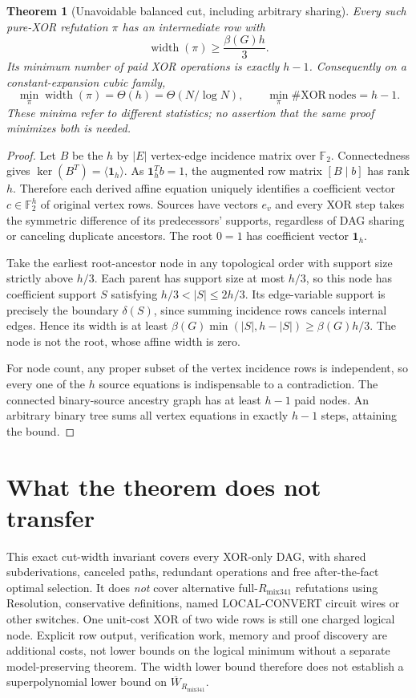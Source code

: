 \documentclass[11pt]{article}
\newtheorem{theorem}{Theorem}
\begin{document}
\begin{theorem}[Unavoidable balanced cut, including arbitrary sharing]
Every such pure-XOR refutation $\pi$ has an intermediate row with
\[
\operatorname{width}(\pi)\ge \frac{\beta(G)h}{3}.
\]
Its minimum number of paid XOR operations is exactly $h-1$. Consequently on a constant-expansion cubic family,
\[
\min_{\pi}\operatorname{width}(\pi)=\Theta(h)=\Theta(N/\log N),
\qquad
\min_{\pi}\#\mathrm{XOR\ nodes}=h-1.
\]
These minima refer to different statistics; no assertion that the same proof minimizes both is needed.
\end{theorem}
\begin{proof}
Let $B$ be the $h$ by $|E|$ vertex-edge incidence matrix over $\mathbb F_2$. Connectedness gives $\ker(B^T)=\langle\mathbf1_h\rangle$. As $\mathbf1_h^Tb=1$, the augmented row matrix $[B\mid b]$ has rank $h$. Therefore each derived affine equation uniquely identifies a coefficient vector $c\in\mathbb F_2^h$ of original vertex rows. Sources have vectors $e_v$ and every XOR step takes the symmetric difference of its predecessors' supports, regardless of DAG sharing or canceling duplicate ancestors. The root $0=1$ has coefficient vector $\mathbf1_h$.

Take the earliest root-ancestor node in any topological order with support size strictly above $h/3$. Each parent has support size at most $h/3$, so this node has coefficient support $S$ satisfying $h/3<|S|\le2h/3$. Its edge-variable support is precisely the boundary $\delta(S)$, since summing incidence rows cancels internal edges. Hence its width is at least $\beta(G)\min(|S|,h-|S|)\ge\beta(G)h/3$. The node is not the root, whose affine width is zero.

For node count, any proper subset of the vertex incidence rows is independent, so every one of the $h$ source equations is indispensable to a contradiction. The connected binary-source ancestry graph has at least $h-1$ paid nodes. An arbitrary binary tree sums all vertex equations in exactly $h-1$ steps, attaining the bound.
\end{proof}

\section*{What the theorem does not transfer}
This exact cut-width invariant covers every XOR-only DAG, with shared subderivations, canceled paths, redundant operations and free after-the-fact optimal selection. It does \emph{not} cover alternative full-$R_{\mathrm{mix341}}$ refutations using Resolution, conservative definitions, named LOCAL-CONVERT circuit wires or other switches. One unit-cost XOR of two wide rows is still one charged logical node. Explicit row output, verification work, memory and proof discovery are additional costs, not lower bounds on the logical minimum without a separate model-preserving theorem. The width lower bound therefore does not establish a superpolynomial lower bound on $\overline W_{R_{\mathrm{mix341}}}$.
\end{document}
